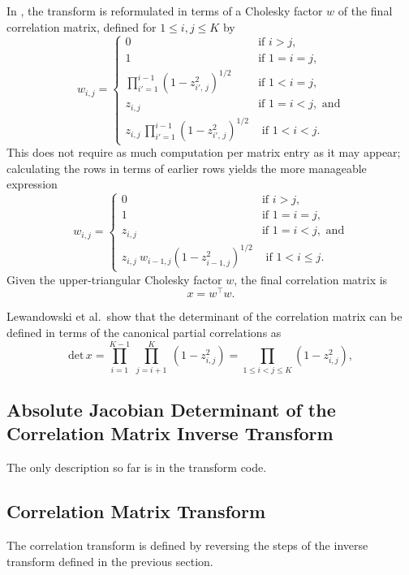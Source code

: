 In \Stan, the \LKJ transform is reformulated in terms of a Cholesky factor $w$
of the final correlation matrix, defined for $1 \leq i,j \leq K$ by
%
\[
w_{i,j} = 
\left\{
\begin{array}{cl}
%
0 & \mbox{if } i > j,
\\[4pt]
1 & \mbox{if } 1 = i = j,
\\[12pt]
\prod_{i'=1}^{i - 1} \left( 1 - z_{i'\!,\,j}^2 \right)^{1/2}
& \mbox{if } 1 < i = j,
\\[12pt]
z_{i,j} & \mbox{if } 1 = i < j, \mbox{ and}
\\[12pt]
z_{i,j} \, \prod_{i'=1}^{i-1} \left( 1 - z_{i'\!,\,j}^2 \right)^{1/2}
& \mbox{ if } 1 < i < j.
%
\end{array}
\right.
\]
%
This does not require as much computation per matrix entry as it may appear; 
calculating the rows in terms of earlier rows yields the more
manageable expression 
%
\[
w_{i,j} = 
\left\{
\begin{array}{cl}
%
0 & \mbox{if } i > j,
\\[4pt]
1 & \mbox{if } 1 = i = j, 
\\[8pt]
z_{i,j} & \mbox{if } 1 = i < j, \mbox{ and}
\\[8pt]
z_{i,j} \ w_{i-1,j} \left( 1 - z_{i-1,j}^2 \right)^{1/2}
& \mbox{ if } 1 < i \leq j.
%
\end{array}
\right.
\]
Given the upper-triangular Cholesky factor $w$, the final correlation
matrix is
\[
x = w^{\top} w.
\]

Lewandowski et al.\ show that the determinant of the correlation
matrix can be defined in terms of the canonical partial correlations
as
%
\[
\mbox{det} \, x = \prod_{i=1}^{K-1} \ \prod_{j=i+1}^K \ (1 - z_{i,j}^2)
 = \prod_{1 \leq i < j \leq K} (1 - z_{i,j}^2),
\]

\subsection{Absolute Jacobian Determinant of the Correlation
  Matrix Inverse Transform}

The only description so far is in the \Stan transform code.

\subsection{Correlation Matrix Transform}

The correlation transform is defined by reversing the steps of the
inverse transform defined in the previous section.  

